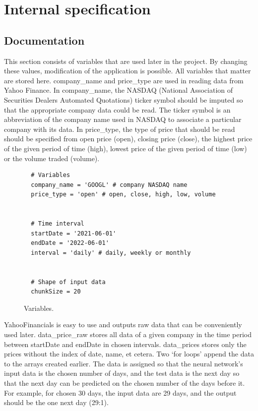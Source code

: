 \chapter{Internal specification}


\section{Documentation}

This section consists of variables that are used later in the project. By changing these values, modification of the application is possible. All variables that matter are stored here. company{\_}name and price{\_}type are used in reading data from Yahoo Finance. In company{\_}name, the NASDAQ (National Association of Securities Dealers Automated Quotations) ticker symbol should be imputed so that the appropriate company data could be read. The ticker symbol is an abbreviation of the company name used in NASDAQ to associate a particular company with its data. In price{\_}type, the type of price that should be read should be specified from open price (open), closing price (close), the highest price of the given period of time (high), lowest price of the given period of time (low) or the volume traded (volume).

\begin{figure}
\centering
\begin{lstlisting}
  # Variables
  company_name = 'GOOGL' # company NASDAQ name
  price_type = 'open' # open, close, high, low, volume
  
  
  # Time interval
  startDate = '2021-06-01'
  endDate = '2022-06-01'
  interval = 'daily' # daily, weekly or monthly
  
  
  # Shape of input data
  chunkSize = 20
\end{lstlisting}
\caption{Variables.}
\label{fig:pseudocode:listings}
\end{figure}

\clearpage
YahooFinancials is easy to use and outputs raw data that can be conveniently used later. data{\_}price{\_}raw stores all data of a given company in the time period between startDate and endDate in chosen intervals. data{\_}prices stores only the prices without the index of date, name, et cetera.
Two ‘for loops’ append the data to the arrays created earlier. The data is assigned so that the neural network’s input data is the chosen number of days, and the test data is the next day so that the next day can be predicted on the chosen number of the days before it. For example, for chosen 30 days, the input data are 29 days, and the output should be the one next day (29:1).

